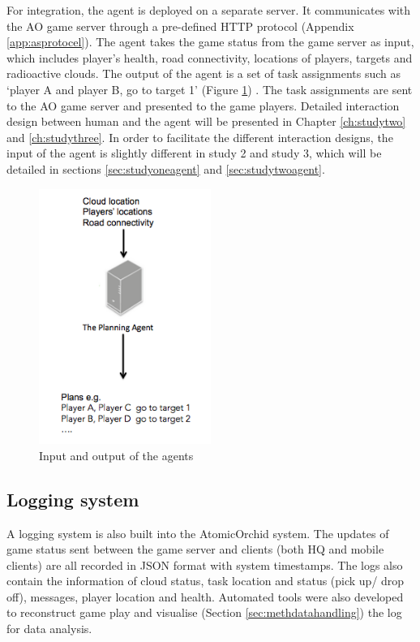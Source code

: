 For integration, the agent is deployed on a separate server. It communicates with the \ac{AO} game server through a pre-defined HTTP protocol (Appendix \ref{app:asprotocel}). The agent takes the game status from the game server as input, which includes player's health, road connectivity, locations of players, targets and radioactive clouds. The output of the agent is a set of task assignments such as `player A and player B, go to target 1' (Figure \ref{fig:inputoutput}) . The task assignments are sent to the \ac{AO} game server and presented to the game players. Detailed interaction design between human and the agent will be presented in Chapter \ref{ch:studytwo} and \ref{ch:studythree}. In order to facilitate the different interaction designs, the input of the agent is slightly different in study 2 and study 3, which will be detailed in sections \ref{sec:studyoneagent} and \ref{sec:studytwoagent}. \\

\begin{figure}[h]
  \centering
  \includegraphics[width=0.5\textwidth]{img/approach/inputoutput}
  \caption{Input and output of the agents}
  \label{fig:inputoutput}
\end{figure}

\subsection{Logging system} \label{sec:applogging}
A logging system is also built into the AtomicOrchid system. The updates of game status sent between the game server and clients (both HQ and mobile clients) are all recorded in JSON format with system timestamps. The logs also contain the information of cloud status, task location and status (pick up/ drop off), messages, player location and health. Automated tools were also developed to reconstruct game play and visualise (Section \ref{sec:methdatahandling}) the log for data analysis. %

